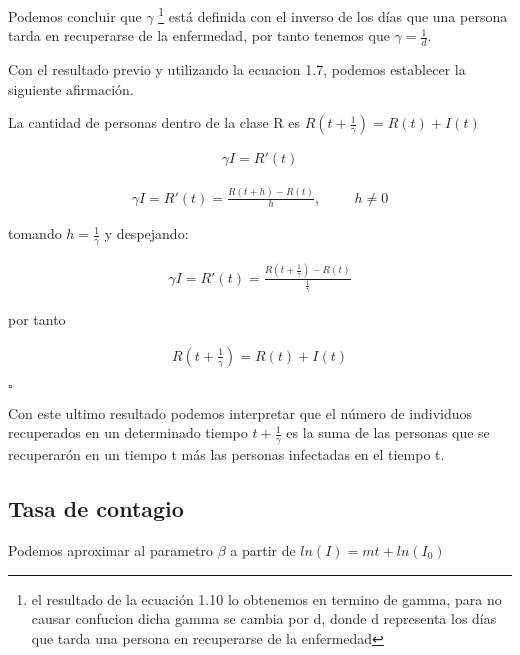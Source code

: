 Podemos concluir que $\gamma$ \footnote{el resultado de la ecuación 1.10 lo obtenemos en termino de gamma, para no causar confucion dicha gamma se cambia por d, donde d representa los días que tarda una persona en recuperarse de la enfermedad} está definida con el inverso de los días que una persona tarda en recuperarse de la enfermedad, por tanto tenemos que $\gamma = \frac{1}{d}$.

Con el resultado previo y utilizando la ecuacion 1.7, podemos establecer la siguiente afirmación.

\begin{Af}
La cantidad de personas dentro de la clase R es $R(t+\frac{1}{\gamma}) = R(t) + I(t)$
\end{Af}

\begin{Dem}
\begin{align*}
\gamma I = R'(t)
\end{align*}

\begin{align*}
\gamma I = R'(t) = \frac{R\left( t + h \right) - R\left(t\right)}{h}, \hspace{1cm} h \neq 0
\end{align*}

tomando $h = \frac{1}{\gamma}$ y despejando: 

\begin{align*}
\gamma I = R'(t) = \frac{R\left( t + \frac{1}{\gamma} \right) - R\left(t\right)}{\frac{1}{\gamma}}
\end{align*}

por tanto

\begin{align*}
R\left( t + \frac{1}{\gamma} \right) = R(t) + I(t)
\end{align*}

\hfill	$\square$
\end{Dem}

Con este ultimo resultado podemos interpretar que el número de individuos recuperados en un determinado tiempo $t + \frac {1}{\gamma}$  es la suma de las personas que se recuperarón en un tiempo t más las personas infectadas en el tiempo t.

\subsection{\textbf{Tasa de contagio}}

\begin{Af}
Podemos aproximar al parametro $\beta$ a partir de $ln(I) = mt + ln(I_{0})$ \cite{Algeria}
\end{Af}

